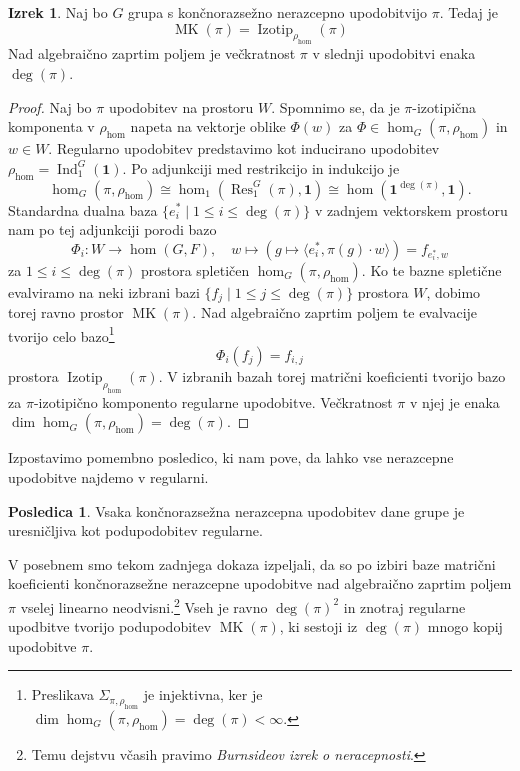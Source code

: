 \documentclass[11pt]{book}
\def\11{\mathbf{1}}
\DeclareMathOperator\Res{Res}
\DeclareMathOperator\Ind{Ind}
\DeclareMathOperator\Izotip{Izotip}
\DeclareMathOperator\MK{MK}
\theoremstyle{definition}
\theoremstyle{zgled}
\theoremstyle{odprtproblem}
\theoremstyle{domacanaloga}
\newenvironment{dokaz}
    {\color{siva}\begin{proof}}
    {\end{proof}}
\theoremstyle{izrek}
\newtheorem*{izrek}{Izrek}
\newtheorem*{posledica}{Posledica}
\begin{document}
\begin{izrek}
Naj bo $G$ grupa s končnorazsežno nerazcepno upodobitvijo $\pi$. Tedaj je
\[
   \textstyle  \MK(\pi) = \Izotip_{\rho_{\hom}}(\pi)
\]
Nad algebraično zaprtim poljem je večkratnost $\pi$ v slednji upodobitvi enaka $\deg(\pi)$.
\end{izrek}
\begin{dokaz}
Naj bo $\pi$ upodobitev na prostoru $W$. Spomnimo se, da je $\pi$-izotipična komponenta v $\rho_{\hom}$ napeta na vektorje oblike $\Phi(w)$ za $\Phi \in \hom_G(\pi, \rho_{\hom})$ in $w \in W$. Regularno upodobitev predstavimo kot inducirano upodobitev $\rho_{\hom} = \Ind^G_1(\11)$. Po adjunkciji med restrikcijo in indukcijo je
\[
    \textstyle \hom_G(\pi, \rho_{\hom}) \cong \hom_1(\Res^G_1(\pi), \11)
    \cong \hom(\11^{\deg(\pi)}, \11).
\]
Standardna dualna baza $\{ e_i^* \mid 1 \leq i \leq \deg(\pi) \}$ v zadnjem vektorskem prostoru nam po tej adjunkciji porodi bazo
\[
    \Phi_i \colon W \to \hom(G,F), \quad
    w \mapsto \left( g \mapsto \langle e_i^*, \pi(g) \cdot w \rangle \right) = f_{e_i^*, w}
\]
za $1 \leq i \leq \deg(\pi)$ prostora spletičen $\hom_G(\pi, \rho_{\hom})$. Ko te bazne spletične evalviramo na neki izbrani bazi $\{ f_j \mid 1 \leq j \leq \deg(\pi) \}$ prostora $W$, dobimo torej ravno prostor $\MK(\pi)$. Nad algebraično zaprtim poljem te evalvacije tvorijo celo bazo\footnote{Preslikava $\Sigma_{\pi, \rho_{\hom}}$ je injektivna, ker je $\dim \hom_G(\pi, \rho_{\hom}) = \deg(\pi) < \infty$.}
\[
    \Phi_i(f_j) = f_{i,j}
\]
prostora $\Izotip_{\rho_{\hom}}(\pi)$. V izbranih bazah torej matrični koeficienti tvorijo bazo za $\pi$-izotipično komponento regularne upodobitve. Večkratnost $\pi$ v njej je enaka $\dim \hom_G(\pi, \rho_{\hom}) = \deg(\pi)$.
\end{dokaz}

Izpostavimo pomembno posledico, ki nam pove, da lahko vse nerazcepne upodobitve najdemo v regularni.

\begin{posledica}
Vsaka končnorazsežna nerazcepna upodobitev dane grupe je uresničljiva kot podupodobitev regularne.
\end{posledica}

V posebnem smo tekom zadnjega dokaza izpeljali, da so po izbiri baze matrični koeficienti končnorazsežne nerazcepne upodobitve nad algebraično zaprtim poljem $\pi$ vselej linearno neodvisni.\footnote{Temu dejstvu včasih pravimo \emph{Burnsideov izrek o neracepnosti}.} Vseh je ravno $\deg(\pi)^2$ in znotraj regularne upodbitve tvorijo podupodobitev $\MK(\pi)$, ki sestoji iz $\deg(\pi)$ mnogo kopij upodobitve $\pi$.
\end{document}
